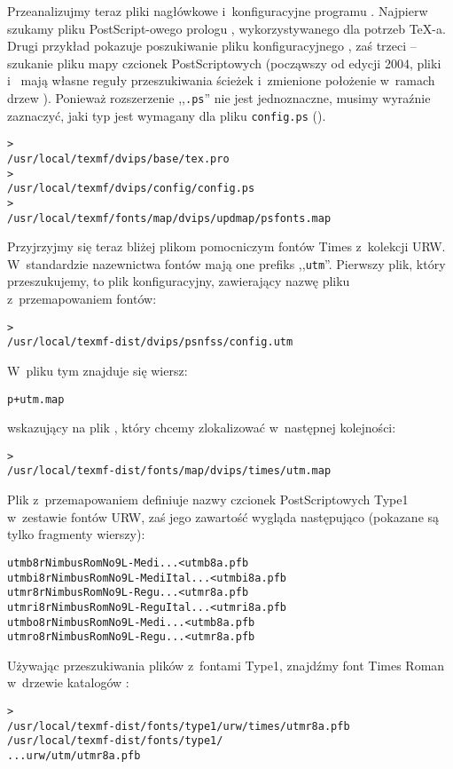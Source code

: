 \documentclass{article}
\renewcommand{\samp}[1]{,,\texttt{#1}''}  %
\begin{document}
Przeanalizujmy teraz pliki nagłówkowe i~konfiguracyjne
programu .
Najpierw szukamy pliku PostScript-owego prologu ,
wykorzystywanego dla potrzeb \TeX-a.  Drugi przykład pokazuje
poszukiwanie pliku konfiguracyjnego , zaś trzeci --
szukanie pliku mapy czcionek PostScriptowych 
(począwszy od edycji 2004, pliki  i~
mają własne reguły przeszukiwania ścieżek i~zmienione położenie w~ramach
drzew ).
Ponieważ rozszerzenie \samp{.ps} nie jest jednoznaczne, musimy
wyraźnie zaznaczyć, jaki typ jest wymagany dla pliku
\texttt{config.ps} ().
\begin{alltt}
> 
   /usr/local/texmf/dvips/base/tex.pro
> 
   /usr/local/texmf/dvips/config/config.ps
> 
   /usr/local/texmf/fonts/map/dvips/updmap/psfonts.map
\end{alltt}

Przyjrzyjmy się teraz bliżej plikom pomocniczym fontów Times  \PS{} z~kolekcji
URW. W~standardzie nazewnictwa fontów mają one prefiks \samp{utm}.
Pierwszy plik, który przeszukujemy, to plik konfiguracyjny, zawierający nazwę
pliku z~przemapowaniem fontów:
\begin{alltt}
> 
   /usr/local/texmf-dist/dvips/psnfss/config.utm
\end{alltt}
W~pliku tym znajduje się  wiersz:
\begin{alltt}
  p +utm.map
\end{alltt}
wskazujący na plik , który chcemy zlokalizować w~następnej
kolejności:
\begin{alltt}
> 
   /usr/local/texmf-dist/fonts/map/dvips/times/utm.map
\end{alltt}
Plik z~przemapowaniem definiuje nazwy czcionek PostScriptowych Type1
w~zestawie fontów URW, zaś jego zawartość wygląda następująco
(pokazane są tylko fragmenty wierszy):
\begin{alltt}
utmb8r  NimbusRomNo9L-Medi    ... <utmb8a.pfb
utmbi8r NimbusRomNo9L-MediItal... <utmbi8a.pfb
utmr8r  NimbusRomNo9L-Regu    ... <utmr8a.pfb
utmri8r NimbusRomNo9L-ReguItal... <utmri8a.pfb
utmbo8r NimbusRomNo9L-Medi    ... <utmb8a.pfb
utmro8r NimbusRomNo9L-Regu    ... <utmr8a.pfb
\end{alltt}
Używając przeszukiwania plików z~fontami Type1, znajdźmy font
Times Roman  w~drzewie katalogów :
\begin{alltt}
> 
\ifSingleColumn   /usr/local/texmf-dist/fonts/type1/urw/times/utmr8a.pfb
\else   /usr/local/texmf-dist/fonts/type1/
... urw/utm/utmr8a.pfb
\fi\end{alltt}
\end{document}
